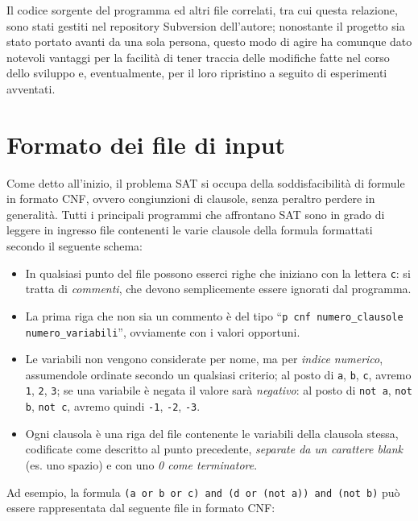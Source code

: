 \documentclass[12pt, a4paper, twosides]{report}
\begin{document}
Il codice sorgente del programma ed altri file correlati, tra cui questa relazione, sono stati gestiti nel repository Subversion dell'autore; nonostante il progetto sia stato portato avanti da una sola persona, questo modo di agire ha comunque dato notevoli vantaggi per la facilità di tener traccia delle modifiche fatte nel corso dello sviluppo e, eventualmente, per il loro ripristino a seguito di esperimenti avventati.





\section{Formato dei file di input}

Come detto all'inizio, il problema SAT si occupa della soddisfacibilità di formule in formato CNF, ovvero congiunzioni di clausole, senza peraltro perdere in generalità. Tutti i principali programmi che affrontano SAT sono in grado di leggere in ingresso file contenenti le varie clausole della formula formattati secondo il seguente schema:

\begin{itemize}
\item In qualsiasi punto del file possono esserci righe che iniziano con la lettera \verb|c|: si tratta di \textit{commenti}, che devono semplicemente essere ignorati dal programma.

\item La prima riga che non sia un commento è del tipo ``\verb|p cnf numero_clausole numero_variabili|'', ovviamente con i valori opportuni.

\item Le variabili non vengono considerate per nome, ma per \textit{indice numerico}, assumendole ordinate secondo un qualsiasi criterio; al posto di \verb|a|, \verb|b|, \verb|c|, avremo \verb|1|, \verb|2|, \verb|3|; se una variabile è negata il valore sarà \textit{negativo}: al posto di \verb|not a|, \verb|not b|, \verb|not c|, avremo quindi \verb|-1|, \verb|-2|, \verb|-3|.

\item Ogni clausola è una riga del file contenente le variabili della clausola stessa, codificate come descritto al punto precedente, \textit{separate da un carattere blank} (es. uno spazio) e con uno \textit{0 come terminatore}.
\end{itemize}

Ad esempio, la formula \verb|(a or b or c) and (d or (not a)) and (not b)| può essere rappresentata dal seguente file in formato CNF:
\end{document}
